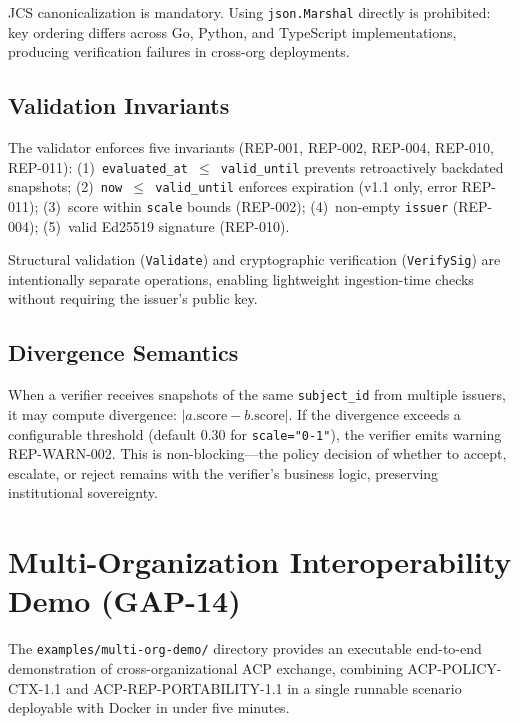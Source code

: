 \documentclass[11pt]{article}
\theoremstyle{definition}
\begin{document}
JCS canonicalization is mandatory. Using \texttt{json.Marshal} directly is prohibited: key ordering differs across Go, Python, and TypeScript implementations, producing verification failures in cross-org deployments.

\subsection{Validation Invariants}

The validator enforces five invariants (REP-001, REP-002, REP-004, REP-010, REP-011):
(1)~\texttt{evaluated\_at $\le$ valid\_until} prevents retroactively backdated snapshots;
(2)~\texttt{now $\le$ valid\_until} enforces expiration (v1.1 only, error REP-011);
(3)~score within \texttt{scale} bounds (REP-002);
(4)~non-empty \texttt{issuer} (REP-004);
(5)~valid Ed25519 signature (REP-010).

Structural validation (\texttt{Validate}) and cryptographic verification (\texttt{VerifySig}) are intentionally separate operations, enabling lightweight ingestion-time checks without requiring the issuer's public key.

\subsection{Divergence Semantics}

When a verifier receives snapshots of the same \texttt{subject\_id} from multiple issuers, it may compute divergence: $|a.\text{score} - b.\text{score}|$.
If the divergence exceeds a configurable threshold (default 0.30 for \texttt{scale="0-1"}), the verifier emits warning REP-WARN-002.
This is non-blocking---the policy decision of whether to accept, escalate, or reject remains with the verifier's business logic, preserving institutional sovereignty.

\section{Multi-Organization Interoperability Demo (GAP-14)}
\label{sec:demo}

The \texttt{examples/multi-org-demo/} directory provides an executable end-to-end demonstration of cross-organizational ACP exchange, combining ACP-POLICY-CTX-1.1 and ACP-REP-PORTABILITY-1.1 in a single runnable scenario deployable with Docker in under five minutes.
\end{document}
